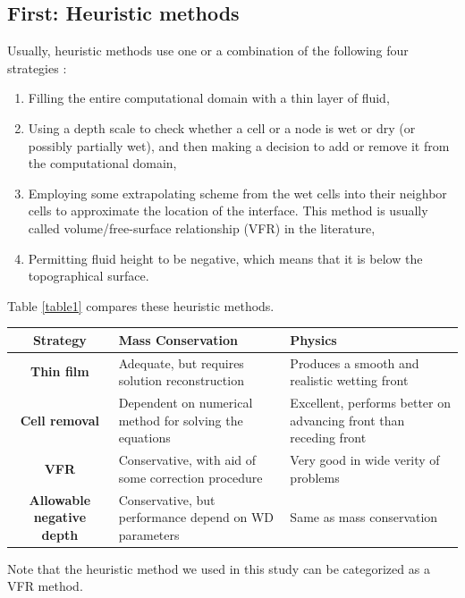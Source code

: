 \documentclass[letterpaper,10pt]{article}
\begin{document}
\subsection{First: Heuristic methods} \label{Heuristic}
Usually, heuristic methods use one or a combination of the following four strategies \cite{Medeiros2013}: 
\begin{enumerate}
        \item Filling the entire computational domain with a thin layer of fluid,
        \item Using a depth scale to check whether a cell or a node is wet or dry 
         (or possibly partially wet), and then  making a decision to add or remove it 
         from the computational domain,
        \item Employing some extrapolating scheme from the wet cells into their neighbor 
         cells to approximate the location of the interface. This method is usually called 
         volume/free-surface relationship (VFR) in the literature,
        \item Permitting fluid height to be negative, which means that it is below the topographical surface.
\end{enumerate}
Table \ref{table1} compares these heuristic methods.
\begin{center}\label{table1}
        \begin{tabular}{|c|p{5cm}|p{5cm}|}
                \hline
                {\bf Strategy}                  & {\bf Mass Conservation}                                          & {\bf Physics} \\
                \hline
                {\bf Thin film}                 & Adequate, but requires solution reconstruction 
                & Produces a smooth and realistic wetting front     \\
                \hline 
                {\bf Cell removal}              & Dependent on numerical method for solving the equations          & Excellent, performs better on advancing front than receding front \\
                \hline
                {\bf VFR}                       & Conservative, with aid of some correction procedure              & Very good in wide verity of problems      \\
                \hline
                {\bf Allowable negative depth}  & Conservative, but performance depend on WD parameters            & Same as mass conservation      \\
                \hline
        \end{tabular}
\end{center}
Note that the heuristic method we used in this study can be categorized as a VFR method. 
\end{document}

